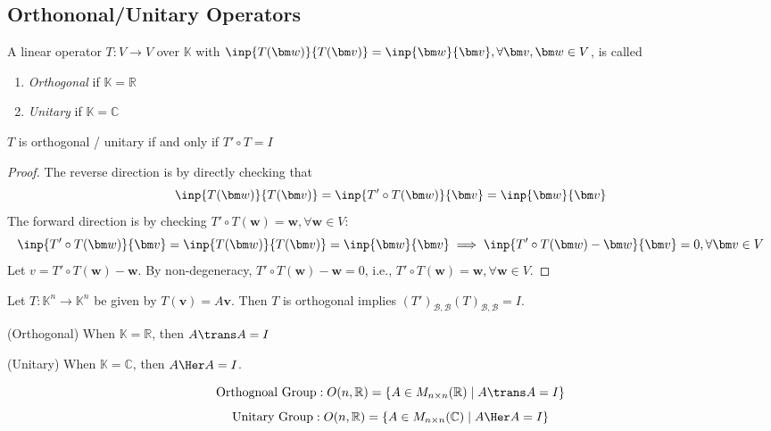 \subsection{Orthononal/Unitary Operators}
\begin{definition}
A linear operator $T:V\to V$ over $\mathbb{K}$ with $\inp{T(\bm w)}{T(\bm v)}=\inp{\bm w}{\bm v},\forall \bm v,\bm w\in V$, is called
\begin{enumerate}
\item
\emph{Orthogonal} if $\mathbb{K}=\mathbb{R}$
\item
\emph{Unitary} if $\mathbb{K}=\mathbb{C}$
\end{enumerate}
\end{definition}
\begin{proposition}
$T$ is orthogonal / unitary if and only if $T'\circ T=I$
\end{proposition}
\begin{proof}
The reverse direction is by directly checking that 
\[
\inp{T(\bm w)}{T(\bm v)}=\inp{T'\circ T(\bm w)}{\bm v}=\inp{\bm w}{\bm v}
\]
The forward direction is by checking $T'\circ T(\bm w)=\bm w,\forall \bm w\in V$:
\[
\inp{T'\circ T(\bm w)}{\bm v}=\inp{T(\bm w)}{T(\bm v)}=\inp{\bm w}{\bm v}
\implies
\inp{T'\circ T(\bm w)-\bm w}{\bm v}=0,\forall \bm v\in V
\]
Let $v = T'\circ T(\bm w)-\bm w$. By non-degeneracy, $T'\circ T(\bm w)-\bm w=0$, i.e.,
$T'\circ T(\bm w)=\bm w,\forall \bm w\in V$.
\end{proof}

\begin{example}
Let $T:\mathbb{K}^n\to\mathbb{K}^n$ be given by $T(\bm v)=A\bm v$.
Then $T$ is orthogonal implies $(T')_{\mathcal{B},\mathcal{B}}(T)_{\mathcal{B},\mathcal{B}}=I$.

(Orthogonal) When $\mathbb{K}=\mathbb{R}$, then $A\trans A=I$

(Unitary) When $\mathbb{K}=\mathbb{C}$, then $A\Her A=I$.
\end{example}

\begin{definition}
\[\text{Orthognoal Group}:
O(n,\mathbb{R})=\{A\in M_{n\times n}(\mathbb{R})\mid A\trans A=I\}
\]
\[\text{Unitary Group}:
O(n,\mathbb{R})=\{A\in M_{n\times n}(\mathbb{C})\mid A\Her A=I\}
\]
\end{definition}














